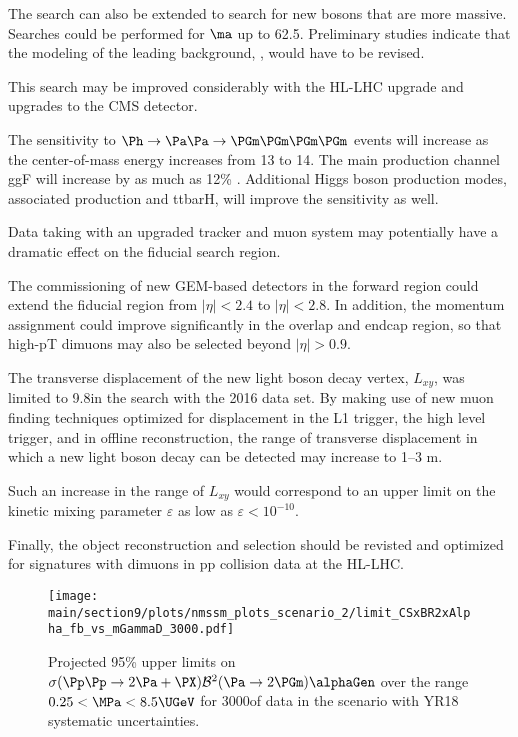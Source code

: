 The search can also be extended to search for new bosons that are more massive. Searches could be performed for $\ma$ up to 62.5\UGeV. Preliminary studies indicate that the modeling of the leading background, \bbbar, would have to be revised.

This search may be improved considerably with the HL-LHC upgrade and upgrades to the CMS detector.

The sensitivity to $\Ph\to\Pa\Pa\to\PGm\PGm\PGm\PGm$ events will increase as the center-of-mass energy increases from 13 to 14\UTeV. The main production channel ggF will increase by as much as 12\% \cite{deFlorian:2016spz}. Additional Higgs boson production modes, associated production and ttbarH, will improve the sensitivity as well.


Data taking with an upgraded tracker and muon system may potentially have a dramatic effect on the fiducial search region.

The commissioning of new GEM-based detectors in the forward region could extend the fiducial region from $|\eta| < 2.4$ to $|\eta| < 2.8$. In addition, the momentum assignment could improve significantly in the overlap and endcap region, so that high-pT dimuons may also be selected beyond $|\eta| > 0.9$.

The transverse displacement of the new light boson decay vertex, $L_{xy}$, was limited to 9.8\Ucm in the search with the 2016 data set. By making use of new muon finding techniques optimized for displacement in the L1 trigger, the high level trigger, and in offline reconstruction, the range of transverse displacement in which a new light boson decay can be detected may increase to {1--3 m}.

Such an increase in the range of $L_{xy}$ would correspond to an upper limit on the kinetic mixing parameter $\varepsilon$ as low as $\varepsilon<10^{-10}$.

Finally, the object reconstruction and selection should be revisted and optimized for signatures with dimuons in pp collision data at the HL-LHC.

\begin{figure}
\centering
\texttt{[image: \\main/section9/plots/nmssm\_plots\_scenario\_2/limit\_CSxBR2xAlpha\_fb\_vs\_mGammaD\_3000.pdf]}
\caption{Projected 95\% \CL upper limits on ${\sigma(\Pp\Pp \to 2 \Pa + \PX)  \mathcal{B}^2 (\Pa \to 2\PGm)  \alphaGen}$ over the range ${0.25 < \MPa < 8.5\UGeV}$ for 3000\fbinv of data in the scenario with YR18 systematic uncertainties.}
\label{fig:my_label1}
\end{figure}

